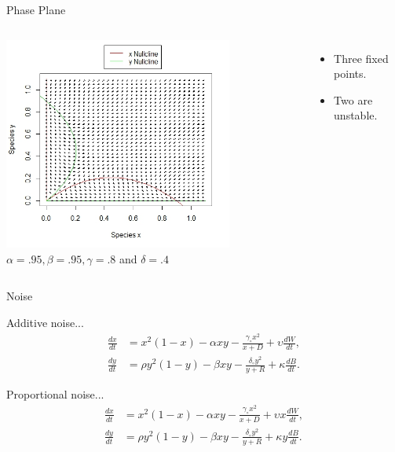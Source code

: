 \begin{frame}{Phase Plane}
\begin{columns}
     {
      \includegraphics[height=7cm]{img/Rplot4} 
      $\alpha = .95, \beta = .95, \gamma = .8$ and $\delta = .4$ 
      \begin{itemize}
      \item Three fixed points.
      \item Two are unstable.
      \end{itemize}
    }

  \end{columns}
\end{frame}




\begin{frame}{Noise}

  Additive noise...
  \begin{align*}
    \frac{dx}{dt} &= x^2 (1-x) - \alpha xy - \frac{\gamma_\circ x^2}{x+D} + \upsilon \frac{dW}{dt}, \\
    \frac{dy}{dt} &= \rho y^2 (1-y) - \beta xy -\frac{\delta_\circ y^2}{y+R}+ \kappa \frac{dB}{dt}.
  \end{align*}

  Proportional noise...
  \begin{align*}
    \frac{dx}{dt} &= x^2 (1-x) - \alpha xy - \frac{\gamma_\circ x^2}{x+D} + \upsilon x \frac{dW}{dt}, \\
    \frac{dy}{dt} &= \rho y^2 (1-y) - \beta xy -\frac{\delta_\circ y^2}{y+R}+ \kappa y \frac{dB}{dt}.
  \end{align*}

\end{frame}




